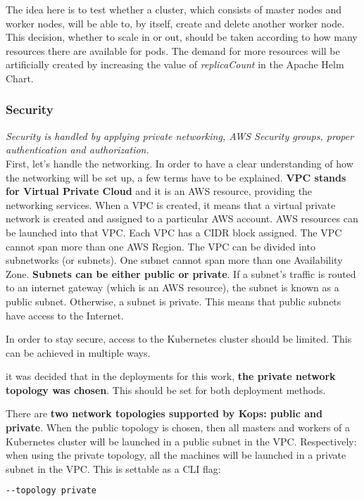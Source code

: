 The idea here is to test whether a cluster, which consists of master nodes and worker nodes, will be able to, by itself, create and delete another worker node. This decision, whether to scale in or out, should be taken according to how many resources there are available for pods. The demand for more resources will be artificially created by increasing the value of \textit{replicaCount} in the Apache Helm Chart\cite{helm-apache}.


\subsubsection{Security}
\textit{Security is handled by applying private networking, AWS Security groups, proper authentication and authorization.}
\\

First, let's handle the networking. In order to have a clear understanding of how the networking will be set up, a few terms have to be explained. \textbf{VPC stands for Virtual Private Cloud} and it is an AWS resource, providing the networking services. When a VPC is created, it means that a virtual private network is created and assigned to a particular AWS account. AWS resources can be launched into that VPC. Each VPC has a CIDR block assigned. The VPC cannot span more than one AWS Region. The VPC can be divided into subnetworks (or subnets). One subnet cannot span more than one Availability Zone. \textbf{Subnets can be either public or private}. If a subnet's traffic is routed to an internet gateway (which is an AWS resource), the subnet is known as a public subnet. Otherwise, a subnet is private\cite{aws-vpc}. This means that public subnets have access to the Internet.

In order to stay secure, access to the Kubernetes cluster should be limited. This can be achieved in multiple ways.


it was decided that in the deployments for this work, \textbf{the private network topology was chosen}. This should be set for both deployment methods.



There are \textbf{two network topologies supported by Kops: public and private}. When the public topology is chosen, then all masters and workers of a Kubernetes cluster will be launched in a public subnet in the VPC. Respectively: when using the private topology, all the machines will be launched in a private subnet in the VPC\cite{kops-net-topo}. This is settable as a CLI flag\cite{kops-net}:
\begin{lstlisting}[basicstyle=\small,caption={CLI flag used by kops to set private networking mode},captionpos=b,language=Bash,xleftmargin=1cm]
--topology private
\end{lstlisting}


